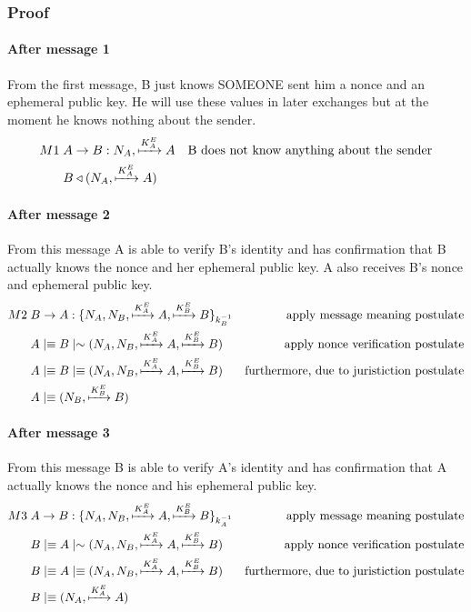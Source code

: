 \subsubsection{Proof}
\paragraph{After message 1} 
From the first message, B just knows SOMEONE sent him a nonce and an ephemeral public key. 
He will use these values in later exchanges but at the moment he knows nothing 
about the sender.
\begin{align*}
    M1 \; &A \rightarrow B : N_A, \xmapsto{K_A^E}A & \text{B does not know anything about the sender} \\
    &B \triangleleft (N_A,\xmapsto{K_A^E}A)
\end{align*}

\paragraph{After message 2} 
From this message A is able to verify B's identity and has confirmation that B
actually knows the nonce and her ephemeral public key. A also receives B's 
nonce and ephemeral public key.
\begin{align*}
    M2 \; &B \rightarrow A : \{N_A,N_B,\xmapsto{K_A^E}A,\xmapsto{K_B^E}B\}_{k_B^{-1}} & \text{apply message meaning postulate} \\
    &A \mid\equiv B \mid\sim (N_A,N_B,\xmapsto{K_A^E}A,\xmapsto{K_B^E}B) & \text{apply nonce verification postulate}  \\
    &A \mid\equiv B \mid\equiv (N_A,N_B,\xmapsto{K_A^E}A,\xmapsto{K_B^E}B) & \text{furthermore, due to juristiction postulate} \\
    &A \mid\equiv (N_B,\xmapsto{K_B^E}B)
\end{align*}

\paragraph{After message 3} 
From this message B is able to verify A's identity and has confirmation that A
actually knows the nonce and his ephemeral public key.
\begin{align*}
    M3 \; &A \rightarrow B : \{N_A,N_B,\xmapsto{K_A^E}A,\xmapsto{K_B^E}B\}_{k_A^{-1}} & \text{apply message meaning postulate} \\
    &B \mid\equiv A \mid\sim (N_A,N_B,\xmapsto{K_A^E}A,\xmapsto{K_B^E}B) & \text{apply nonce verification postulate}  \\
    &B \mid\equiv A \mid\equiv (N_A,N_B,\xmapsto{K_A^E}A,\xmapsto{K_B^E}B) & \text{furthermore, due to juristiction postulate} \\
    &B \mid\equiv (N_A,\xmapsto{K_A^E}A)
\end{align*}

